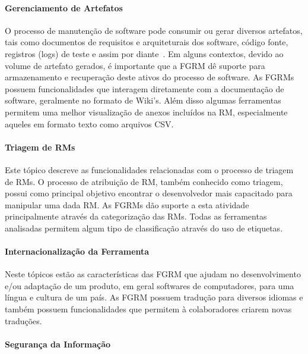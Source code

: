 \paragraph{Gerenciamento de Artefatos}
\label{par:gerenciamento_de_artefatos}

O processo de manutenção de software pode consumir ou gerar diversos artefatos,
tais como documentos de requisitos e arquiteturais dos software, código fonte,
registros (logs) de teste e assim por diante~\cite{cavalcanti2013bug}. Em alguns
contextos, devido ao volume de artefato gerados, é importante que a FGRM dê
suporte para armazenamento e recuperação deste ativos do processo de software.
As FGRMs possuem funcionalidades que interagem diretamente com a documentação
de software, geralmente no formato de Wiki's. Além disso algumas ferramentas
permitem uma melhor visualização de anexos incluídos na RM, especialmente
aqueles em formato texto como arquivos CSV\@.

\paragraph{Triagem de RMs}
\label{par:triagem_de_rm_s}

Este tópico descreve as funcionalidades relacionadas com o processo de triagem
de RMs. O processo de atribuição de RM, também conhecido como triagem, possui
como principal objetivo encontrar o desenvolvedor mais capacitado para manipular
uma dada RM\@. As FGRMs dão suporte a esta atividade principalmente através da
categorização das RMs. Todas as ferramentas analisadas permitem algum tipo de
classificação através do uso de etiquetas.

\paragraph{Internacionalização da Ferramenta}
\label{par:internacionalização_da_ferramenta}

Neste tópicos estão as características das FGRM que ajudam no desenvolvimento
e/ou adaptação de um produto, em geral softwares de computadores, para uma
língua e cultura de um país. As FGRM possuem tradução para diversos idiomas e
também possuem funcionalidades que permitem à colaboradores criarem novas
traduções.

\paragraph{Segurança da Informação}
\label{par:segurança_da_informação}

